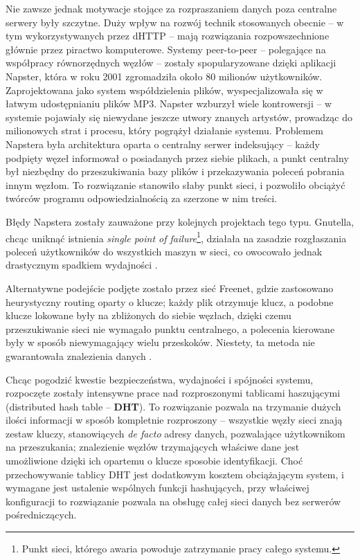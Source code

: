 Nie zawsze jednak motywacje stojące za rozpraszaniem danych poza centralne serwery były szczytne. Duży wpływ na rozwój technik stosowanych obecnie -- w tym wykorzystywanych przez dHTTP -- mają rozwiązania rozpowszechnione głównie przez piractwo komputerowe. Systemy peer-to-peer -- polegające na współpracy równorzędnych węzłów -- zostały spopularyzowane dzięki aplikacji Napster, która w roku 2001 zgromadziła około 80 milionów użytkowników. Zaprojektowana jako system współdzielenia plików, wyspecjalizowała się w łatwym udostępnianiu plików MP3. Napster wzburzył wiele kontrowersji -- w systemie pojawiały się niewydane jeszcze utwory znanych artystów, prowadząc do milionowych strat i procesu, który pogrążył działanie systemu.
Problemem Napstera była architektura oparta o centralny serwer indeksujący -- każdy podpięty węzeł informował o posiadanych przez siebie plikach, a punkt centralny był niezbędny do przeszukiwania bazy plików i przekazywania poleceń pobrania innym węzłom. To rozwiązanie stanowiło słaby punkt sieci, i pozwoliło obciążyć twórców programu odpowiedzialnością za szerzone w nim treści.

Błędy Napstera zostały zauważone przy kolejnych projektach tego typu. Gnutella, chcąc uniknąć istnienia {\em single point of failure}\footnote{Punkt sieci, którego awaria powoduje zatrzymanie pracy całego systemu.}, działała na zasadzie rozgłaszania poleceń użytkowników do wszystkich maszyn w sieci, co owocowało jednak drastycznym spadkiem wydajności \cite{measuringNapsterGnutella}.

Alternatywne podejście podjęte zostało przez sieć Freenet, gdzie zastosowano heurystyczny routing oparty o klucze; każdy plik otrzymuje klucz, a podobne klucze lokowane były na zbliżonych do siebie węzłach, dzięki czemu przeszukiwanie sieci nie wymagało punktu centralnego, a polecenia kierowane były w sposób niewymagający wielu przeskoków. Niestety, ta metoda nie gwarantowała znalezienia danych \cite{searchingInSmallWorld}.

Chcąc pogodzić kwestie bezpieczeństwa, wydajności i spójności systemu, rozpoczęte zostały intensywne prace nad rozproszonymi tablicami haszującymi (distributed hash table -- \textbf{DHT}). To rozwiązanie pozwala na trzymanie dużych ilości informacji w sposób kompletnie rozproszony -- wszystkie węzły sieci znają zestaw kluczy, stanowiących {\em de facto} adresy danych, pozwalające użytkownikom na przeszukania; znalezienie węzłów trzymających właściwe dane jest umożliwione dzięki ich opartemu o klucze sposobie identyfikacji. Choć przechowywanie tablicy DHT jest dodatkowym kosztem obciążającym system, i wymagane jest ustalenie wspólnych funkcji hashujących, przy właściwej konfiguracji to rozwiązanie pozwala na obsługę całej sieci danych bez serwerów pośredniczących.

